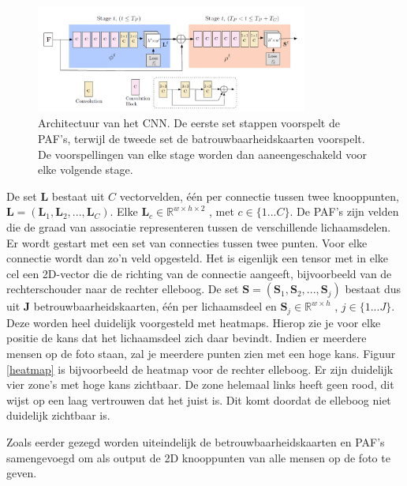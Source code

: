 \documentclass[a4paper,twoside,kulak]{kulakreport}
\begin{document}
\begin{figure}[H]
	\centering
	\includegraphics[width=0.8\textwidth]{algoritme_architectuur}
	\caption{Architectuur van het CNN. De eerste set stappen voorspelt de PAF's, terwijl de tweede set de batrouwbaarheidskaarten voorspelt. De voorspellingen van elke stage worden dan aaneengeschakeld voor elke volgende stage. \cite{cao2019openpose}}
	\label{algoritme}
\end{figure}

De set \textbf{L} bestaat uit $C$ vectorvelden, één per connectie tussen twee knooppunten, $\textbf{L} = (\textbf{L}_1,\textbf{L}_2,...,\textbf{L}_C)$. Elke $\textbf{L}_c \in \mathbb{R}^{w \times h \times 2}$ , met $c \in \{1...C\}.$ De PAF’s  zijn velden die de graad van associatie representeren tussen de verschillende lichaamsdelen. Er wordt gestart met een set van connecties tussen twee punten. Voor elke connectie wordt dan zo’n veld opgesteld. Het is eigenlijk een tensor met in elke cel een 2D-vector die de richting van de connectie aangeeft, bijvoorbeeld van de rechterschouder naar de rechter elleboog.
De set $\textbf{S} = (\textbf{S}_1,\textbf{S}_2,...,\textbf{S}_j)$ bestaat dus uit $\textbf{J}$ betrouwbaarheidskaarten, één per lichaamsdeel en $\textbf{S}_j \in \mathbb{R} ^{w \times h}$ , $j \in \{1...J\}$.
Deze worden heel duidelijk voorgesteld met heatmaps. Hierop zie je voor elke positie de kans dat het lichaamsdeel zich daar bevindt. Indien er meerdere mensen op de foto staan, zal je meerdere punten zien met een hoge kans. Figuur \ref{heatmap} is bijvoorbeeld de heatmap voor de rechter elleboog. Er zijn duidelijk vier zone's met hoge kans zichtbaar. De zone helemaal links heeft geen rood, dit wijst op een laag vertrouwen dat het juist is. Dit komt doordat de elleboog niet duidelijk zichtbaar is.

Zoals eerder gezegd worden uiteindelijk de betrouwbaarheidskaarten en PAF's samengevoegd om als output de 2D knooppunten van alle mensen op de foto te geven.
\end{document}
